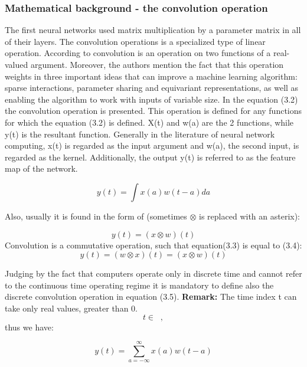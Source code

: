 \documentclass[12pt,a4paper,twoside]{report}
\DeclareMathOperator{\Rplus}{\mathbb{R}^{+}}
\begin{document}
\subsubsection{Mathematical background - the convolution operation}

The first neural networks used matrix multiplication by a parameter matrix in all of their layers. The convolution operations is a specialized type of linear operation. According to \cite{book-deeplearning} convolution is an operation on two functions of a real-valued argument. Moreover, the authors mention the fact that this operation weights in three important ideas that can improve a machine learning algorithm: sparse interactions, parameter sharing and equivariant representations, as well as enabling the algorithm to work with inputs of variable size. In the equation (3.2) the convolution operation is presented. This operation is defined for any functions for which the equation (3.2) is defined. X(t) and w(a) are the 2 functions, while y(t) is the resultant function. Generally in the literature of neural network computing, x(t) is regarded as the input argument and w(a), the second input, is regarded as the kernel. Additionally, the output y(t) is referred to as the feature map of the network.

\begin{equation}
y(t) = \int x(a)w(t-a) da
\end{equation}

Also, usually it is found in the form of (sometimes $\otimes$ is replaced with an asterix):

\begin{equation}
y(t)  =  (x\otimes w)(t)
\end{equation}
Convolution is a commutative operation, such that equation(3.3) is equal to (3.4):
\begin{equation}
y(t)  =  (w\otimes x)(t) =  (x\otimes w)(t)
\end{equation}

Judging by the fact that computers operate only in discrete time and cannot refer to the continuous time operating regime it is mandatory to define also the discrete convolution operation in equation (3.5). \textbf{Remark:} The time index t can take only real values, greater than 0.
$$ t \in \Rplus, $$ thus we have:

\begin{equation}
y(t) = \sum_{a=-\infty}^{\infty} x(a)w(t-a)
\end{equation}
\end{document}
